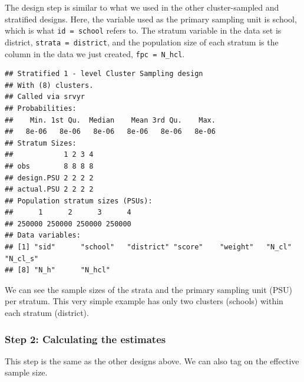 \documentclass[
]{article}
\newenvironment{Shaded}{\begin{snugshade}}{\end{snugshade}}
\newcommand{\DataTypeTok}[1]{\textcolor[rgb]{0.13,0.29,0.53}{#1}}
\newcommand{\KeywordTok}[1]{\textcolor[rgb]{0.13,0.29,0.53}{\textbf{#1}}}
\newcommand{\NormalTok}[1]{#1}
\newcommand{\OperatorTok}[1]{\textcolor[rgb]{0.81,0.36,0.00}{\textbf{#1}}}
\newcommand{\StringTok}[1]{\textcolor[rgb]{0.31,0.60,0.02}{#1}}
\begin{document}
The design step is similar to what we used in the other cluster-sampled and stratified designs. Here, the variable used as the primary sampling unit is school, which is what \texttt{id\ =\ school} refers to. The stratum variable in the data set is district, \texttt{strata\ =\ district}, and the population size of each stratum is the column in the data we just created, \texttt{fpc\ =\ N\_hcl}.

\begin{Shaded}
\end{Shaded}

\begin{verbatim}
## Stratified 1 - level Cluster Sampling design
## With (8) clusters.
## Called via srvyr
## Probabilities:
##    Min. 1st Qu.  Median    Mean 3rd Qu.    Max. 
##   8e-06   8e-06   8e-06   8e-06   8e-06   8e-06 
## Stratum Sizes: 
##            1 2 3 4
## obs        8 8 8 8
## design.PSU 2 2 2 2
## actual.PSU 2 2 2 2
## Population stratum sizes (PSUs): 
##      1      2      3      4 
## 250000 250000 250000 250000 
## Data variables:
## [1] "sid"      "school"   "district" "score"    "weight"   "N_cl"     "N_cl_s"  
## [8] "N_h"      "N_hcl"
\end{verbatim}

We can see the sample sizes of the strata and the primary sampling unit (PSU) per stratum. This very simple example has only two clusters (schools) within each stratum (district).

\hypertarget{step-2-calculating-the-estimates-2}{%
\subsubsection{Step 2: Calculating the estimates}\label{step-2-calculating-the-estimates-2}}

This step is the same as the other designs above. We can also tag on the effective sample size.
\end{document}
